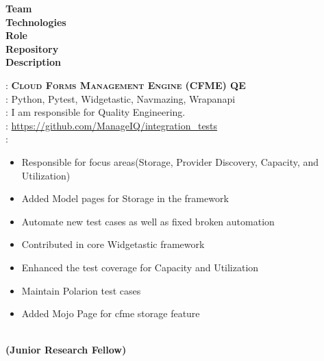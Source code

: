 \documentclass[a4paper,10pt]{memoir} %
\begin{document}
\begin{minipage}[t]{0.20\columnwidth}
\textbf{Team}\\
\textbf{Technologies}\\
\textbf{Role}\\
\textbf{Repository}\\
\textbf{Description}
\end{minipage}
\hfill
\begin{minipage}[t]{0.80\columnwidth}
: \textbf{\textsc{Cloud Forms Management Engine (CFME) QE}}\\
: Python, Pytest, Widgetastic, Navmazing, Wrapanapi\\
: I am responsible for Quality Engineering.\\
: \url{https://github.com/ManageIQ/integration_tests}\\
: \begin{itemize}
\renewcommand{\labelitemi}{\bluebullet}
\item Responsible for focus areas(Storage, Provider Discovery, Capacity, and Utilization) 
\item Added Model pages for Storage in the framework
\item Automate new test cases as well as fixed broken automation 
\item Contributed in core Widgetastic framework 
\item Enhanced the test coverage for Capacity and Utilization
\item Maintain Polarion test cases
\item Added Mojo Page for cfme storage feature 
  \end{itemize}

\end{minipage}

\Sep
\Sep
\begin{minipage}[t]{0.20\columnwidth}
\end{minipage}
\hfill
\begin{minipage}[t]{0.80\columnwidth}
\begin{center}
\\
\textbf{(Junior Research Fellow)}  
\end{center}
\end{minipage}
\end{document}
